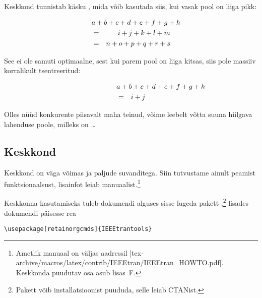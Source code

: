 \noindent Keskkond  tunnistab käsku , mida võib
kasutada siis, kui vasak pool on liiga pikk:
\begin{example}
\begin{eqnarray}
  \lefteqn{a + b + c + d
    + e + f + g + h}\nonumber \\
  & = & i + j + k + l + m \\
  & = & n + o + p + q + r + s
\end{eqnarray}
\end{example}
\noindent See ei ole samuti optimaalne, sest kui parem pool on liiga
kitsas, siis pole massiiv korralikult tsentreeritud:
\begin{example}
\begin{eqnarray}
  \lefteqn{a + b + c + d
    + e + f + g + h}\nonumber \\
  & = & i + j
\end{eqnarray}
\end{example}

\noindent Olles nüüd konkurente piisavalt maha teinud, võime leebelt
võtta suuna hiilgava lahenduse poole, milleks on \ldots

\subsection{Keskkond }
\label{sec:IEEEeqnarray_intro}

Keskkond  on väga võimas ja paljude suvanditega. Siin
tutvustame ainult peamist funktsionaalsust, lisainfot leiab
manuaalist.\footnote{Ametlik manuaal on väljas aadressil
\CTAN|tex-archive/macros/latex/contrib/IEEEtran/IEEEtran_HOWTO.pdf|.
Keskkonda  puudutav osa asub lisas~F.}

Keskkonna  kasutamiseks tuleb dokumendi alguses sisse
lugeda pakett ,\footnote{Pakett 
võib installatsioonist puududa, selle leiab CTANist.} lisades dokumendi
päisesse rea
\begin{lscommand}
\verb|\usepackage[retainorgcmds]{IEEEtrantools}|
\end{lscommand}

